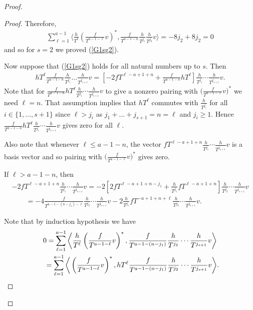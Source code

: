 \begin{proof}
\begin{proof}
Therefore,
\begin{gather*}
\sum_{\ell=1}^{a-1} \bigg\langle \frac{h}{T^{\ell}} \left(\frac{f}{T^{a-1-\ell}}v\right)^*, \frac{f}{T^{a-1-n}} \frac{h}{T^{j_1}} \frac{h}{T^{j_2}} v \bigg\rangle = -8 j_2 + 8 j_2 = 0
\end{gather*}
and so for $s=2$ we proved (\ref{G1sg2}).

Now suppose that (\ref{G1sg2}) holds for all natural numbers up to $s$. Then
\begin{gather*}
hT^{\ell} \frac{f}{T^{a-1-n}} \frac{h}{T^{j_1}}\dots\frac{h}{T^{j_{s+1}}} v = \left[ -2 fT^{\ell-a+1+n} + \frac{f}{T^{a-1-n}} hT^{\ell} \right] \frac{h}{T^{j_1}}\cdots\frac{h}{T^{j_{s+1}}} v.
\end{gather*}
Note that for $\frac{f}{T^{a-1-n}} hT^{\ell} \frac{h}{T^{j_1}} \cdots \frac{h}{T^{j_{s+1}}} v$ to give a nonzero pairing with $\big(\frac{f}{T^{a-1-\ell}}v\big)^*$
we need $\ell=n$. That assumption implies that $hT^{\ell}$ commutes with $\frac{h}{T^{j_i}}$ for all $i \in \{1, \dots, s+1\}$ since $\ell > j_i$ as $j_1+\dots +j_{s+1} =n=\ell$ and $j_i \geq 1$. Hence $ \frac{f}{T^{a-1-n}} hT^{\ell} \frac{h}{T^{j_1}}\cdots \frac{h}{T^{j_{s+1}}} v $ gives zero for all $\ell$.

Also note that whenever $\ell \leq a-1-n$, the vector $fT^{\ell-a+1+n} \frac{h}{T^{j_1}} \cdots \frac{h}{T^{j_{s+1}}} v$ is a basis vector and so pairing with $\big(\frac{f}{T^{a-1-\ell}}v\big)^*$ gives zero.

If $\ell > a-1-n$, then
\begin{gather}
-2 fT^{\ell-a+1+n} \frac{h}{T^{j_1}}\cdots\frac{h}{T^{j_{s+1}}} v=-2 \left[ 2fT^{\ell-a+1+n - j_1} + \frac{h}{T^{j_1}} fT^{\ell-a+1+n}\right] \frac{h}{T^{j_2}}\cdots\frac{h}{T^{j_{s+1}}} v \nonumber \\
\qquad{} = -4 \frac{f}{T^{a-1 - (n-j_1) - \ell}}\frac{h}{T^{j_2}}\cdots\frac{h}{T^{j_{s+1}}}v - 2 \frac{h}{T^{j_1}} fT^{-a+1 + n + \ell} \frac{h}{T^{j_2}}\cdots\frac{h}{T^{j_{s+1}}}v. \label{fs sum}
\end{gather}

Note that by induction hypothesis we have
\begin{gather*}
0 = \sum_{\ell=1}^{a-1} \bigg\langle \frac{h}{T^{\ell}} \left(\frac{f}{T^{a-1-\ell}}v\right)^*, \frac{f}{T^{a-1-(n-j_1)}} \frac{h}{T^{j_2}}\cdots\frac{h}{T^{j_{s+1}}} v \bigg\rangle \nonumber \\
\hphantom{0} = \sum_{\ell=1}^{a-1} \bigg\langle \left(\frac{f}{T^{a-1-\ell}}v\right)^*, hT^{\ell} \frac{f}{T^{a-1-(n-j_1)}} \frac{h}{T^{j_2}}\cdots\frac{h}{T^{j_{s+1}}} v \bigg\rangle. %
\end{gather*}


\end{proof}
\end{proof}
